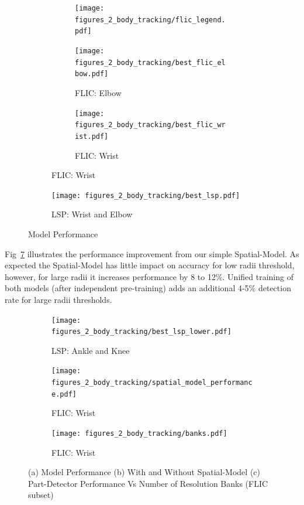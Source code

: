 \begin{figure}[th]
  \centering
  \begin{subfigure}[b]{0.63\textwidth}
    \begin{subfigure}[b]{0.99\textwidth}
          \begin{flushright}
                  \texttt{[image: figures\_2\_body\_tracking/flic\_legend.pdf]}
          \end{flushright}
      \end{subfigure}
    \hfill

    \begin{subfigure}[b]{0.49\textwidth}
          \texttt{[image: figures\_2\_body\_tracking/best\_flic\_elbow.pdf]}
          \caption{FLIC: Elbow}
          \label{fig:flic_elbow}
    \end{subfigure}
    \begin{subfigure}[b]{0.49\textwidth}
          \texttt{[image: figures\_2\_body\_tracking/best\_flic\_wrist.pdf]}
          \caption{FLIC: Wrist}
          \label{fig:flic_wrist}
    \end{subfigure}
  \end{subfigure}
  \begin{subfigure}[b]{0.307\textwidth}
        \texttt{[image: figures\_2\_body\_tracking/best\_lsp.pdf]}
        \caption{LSP: Wrist and Elbow}
        \label{fig:lsp_best}
  \end{subfigure}
  \caption{Model Performance}
  \label{fig:flic_results}
\end{figure} 

Fig~\ref{fig:spatial_model_performance} illustrates the performance improvement from our simple Spatial-Model. As expected the Spatial-Model has little impact on accuracy for low radii threshold, however, for large radii it increases performance by 8 to 12\%. Unified training of both models (after independent pre-training) adds an additional 4-5\% detection rate for large radii thresholds. 

\begin{figure}[th]
  \centering
  \begin{subfigure}[b]{0.31\textwidth}
        \texttt{[image: figures\_2\_body\_tracking/best\_lsp\_lower.pdf]}
        \caption{LSP: Ankle and Knee}
        \label{fig:lsp_best_lower}
  \end{subfigure}
  \begin{subfigure}[b]{0.31\textwidth}
        \texttt{[image: figures\_2\_body\_tracking/spatial\_model\_performance.pdf]}
        \caption{FLIC: Wrist}
        \label{fig:spatial_model_performance}
  \end{subfigure}
  \begin{subfigure}[b]{0.31\textwidth}
        \texttt{[image: figures\_2\_body\_tracking/banks.pdf]}
        \caption{FLIC: Wrist}
        \label{fig:banks}
  \end{subfigure} 
  \caption{(a) Model Performance (b) With and Without Spatial-Model (c) Part-Detector Performance Vs Number of Resolution Banks (FLIC subset)}
  \label{fig:lsp_results_1}
\end{figure}

